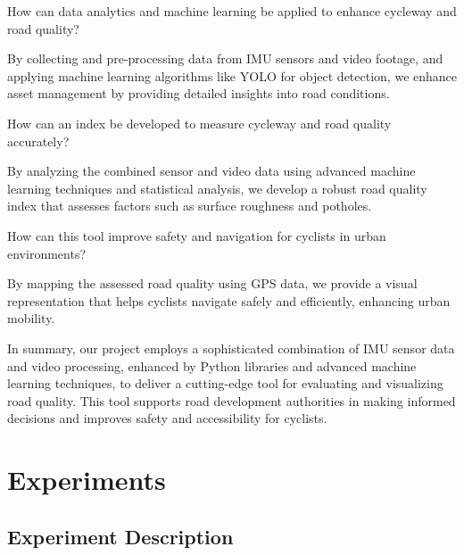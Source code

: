 \documentclass[a4paper,12pt]{Classes/RoboticsLaTeX}
\begin{document}
\begin{abstracts}
\vspace{10pt}

How can data analytics and machine learning be applied to enhance cycleway and road quality?

By collecting and pre-processing data from IMU sensors and video footage, and applying machine learning algorithms like YOLO for object detection, we enhance asset management by providing detailed insights into road conditions.
\vspace{10pt}

How can an index be developed to measure cycleway and road quality accurately?

By analyzing the combined sensor and video data using advanced machine learning techniques and statistical analysis, we develop a robust road quality index that assesses factors such as surface roughness and potholes.
\vspace{10pt}

How can this tool improve safety and navigation for cyclists in urban environments?

By mapping the assessed road quality using GPS data, we provide a visual representation that helps cyclists navigate safely and efficiently, enhancing urban mobility.

In summary, our project employs a sophisticated combination of IMU sensor data and video processing, enhanced by Python libraries and advanced machine learning techniques, to deliver a cutting-edge tool for evaluating and visualizing road quality. This tool supports road development authorities in making informed decisions and improves safety and accessibility for cyclists.
	
	\chapter{Experiments}
	\label{chap:experiments}

		

\section{Experiment Description}


\end{abstracts}
\end{document}
